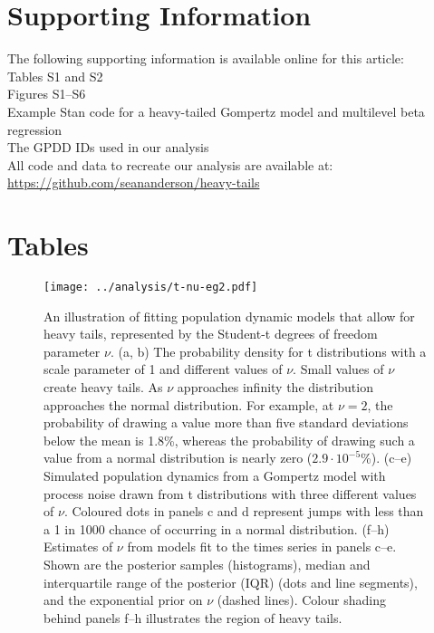 \section{Supporting Information}

The following supporting information is available online for this article:\\
Tables S1 and S2\\
Figures S1--S6\\
Example Stan code for a heavy-tailed Gompertz model and multilevel beta
regression\\
The GPDD IDs used in our analysis\\
All code and data to recreate our analysis are available at:\\
\url{https://github.com/seananderson/heavy-tails}

\renewcommand{\baselinestretch}{\tighttextstretch}
\normalsize



\clearpage
\renewcommand{\baselinestretch}{\textstretch}
\normalsize

\section{Tables}



\clearpage

\begin{figure}[htbp]
\begin{center}
\texttt{[image: ../analysis/t-nu-eg2.pdf]}
\caption[An illustration of fitting population dynamic models that allow for heavy
tails, represented by the Student-t degrees of freedom parameter $\nu$.]{
An illustration of fitting population dynamic models that allow for heavy
tails, represented by the Student-t degrees of freedom parameter $\nu$. (a, b)
The probability density for t distributions with a scale parameter of 1 and
different values of $\nu$. Small values of $\nu$ create heavy tails. As $\nu$
approaches infinity the distribution approaches the normal distribution. For
example, at $\nu = 2$, the probability of drawing a value more than five
standard deviations below the mean is 1.8\%, whereas the probability of drawing
such a value from a normal distribution is nearly zero ($2.9\cdot10^{-5}$\%).
(c--e) Simulated population dynamics from a Gompertz model with process noise
drawn from t distributions with three different values of $\nu$. Coloured dots
in panels c and d represent jumps with less than a 1 in 1000 chance of
occurring in a normal distribution. (f--h) Estimates of $\nu$ from models fit
to the times series in panels c--e. Shown are the posterior samples
(histograms), median and interquartile range of the posterior (IQR) (dots and
line segments), and the exponential prior on $\nu$ (dashed lines). Colour
shading behind panels f--h illustrates the region of heavy tails.
}
\label{fig:didactic}
\end{center}
\end{figure}

